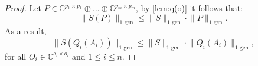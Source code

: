 \begin{proof}
Let $P \in \mathbb{C}^{p_1 \times p_1} \oplus \ldots \oplus  \mathbb{C}^{p_m \times p_m}$, by \autoref{lem:q(o)} it follows that:
\begin{equation}
  \lVert S(P) \rVert_{1 \text{ gen}} \leq \lVert S  \rVert_{1 \text{ gen}} \cdot \lVert P  \rVert_{1 \text{ gen}}.
\end{equation}
As a result, 
\begin{equation} \label{ineq:gen_trace_submultiplicative_O}
  \lVert S (Q_i (A_i)) \rVert_{1 \text{ gen}} \leq \lVert S  \rVert_{1 \text{ gen}} \cdot \lVert Q_i (A_i)  \rVert_{1 \text{ gen}},
\end{equation}
for all $O_i \in \mathbb{C}^{o_i \times o_i}$ and $1 \leq i \leq n$. 


\end{proof}
